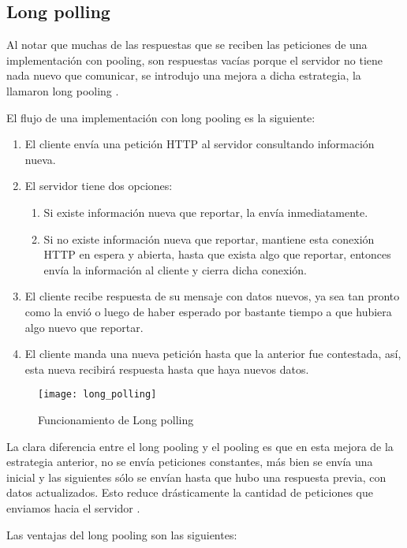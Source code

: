 \subsection{Long polling}

Al notar que muchas de las respuestas que se reciben las peticiones de una implementación con pooling, son respuestas vacías porque el servidor no tiene nada nuevo que comunicar, se introdujo una mejora a dicha estrategia, la llamaron long pooling \cite{app10}.

El flujo de una implementación con long pooling es la siguiente:

\begin{enumerate}
  \item El cliente envía una petición HTTP al servidor consultando información nueva.
  \item El servidor tiene dos opciones:
  \begin{enumerate}
    \item Si existe información nueva que reportar, la envía inmediatamente.
    \item Si no existe información nueva que reportar, mantiene esta conexión HTTP en espera y abierta, hasta que exista algo que reportar, entonces envía la información al cliente y cierra dicha conexión.
  \end{enumerate}
  \item El cliente recibe respuesta de su mensaje con datos nuevos, ya sea tan pronto como la envió o luego de haber esperado por bastante tiempo a que hubiera algo nuevo que reportar.
  \item El cliente manda una nueva petición hasta que la anterior fue contestada, así, esta nueva recibirá respuesta hasta que haya nuevos datos.
\end{enumerate}

\begin{figure}[htp!]
  \centering
  \texttt{[image: long\_polling]}
  \caption{Funcionamiento de Long polling}
  \label{fig:long_polling}
\end{figure}

La clara diferencia entre el long pooling y el pooling es que en esta mejora de la estrategia anterior, no se envía peticiones constantes, más bien se envía una inicial y las siguientes sólo se envían hasta que hubo una respuesta previa, con datos actualizados. Esto reduce drásticamente la cantidad de peticiones que enviamos hacia el servidor \cite{app10}.

Las ventajas del long pooling son las siguientes:

